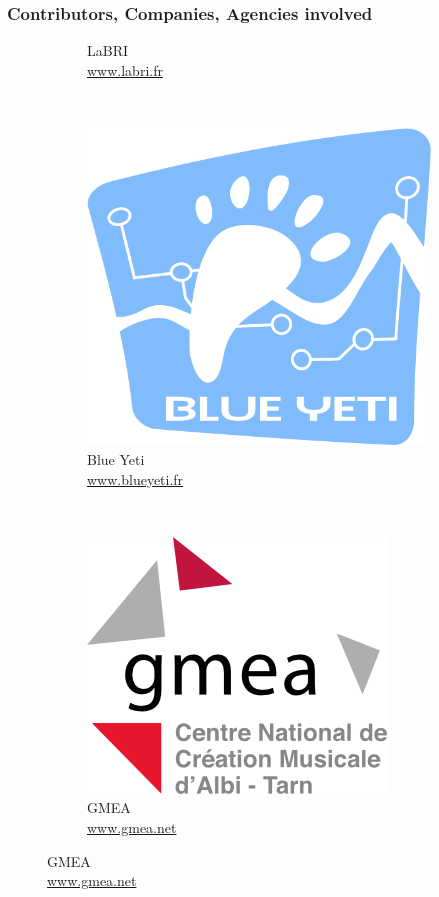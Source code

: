 \documentclass{beamer}
\begin{document}
\begin{frame}
    \frametitle{Contributors, Companies, Agencies involved}
    \begin{figure}[htbp]
    \begin{subfigure}[b]{0.30\textwidth} 
        \centering
        
        \caption{LaBRI \\ \url{www.labri.fr}}
    \end{subfigure}
    ~
    \begin{subfigure}[b]{0.30\textwidth} 
        \centering
        \includegraphics[scale=0.12]{images/by.png}
        \caption[]{Blue Yeti\\ \url{www.blueyeti.fr}}
    \end{subfigure}
    ~
    \begin{subfigure}[b]{0.30\textwidth} 
        \centering
        \includegraphics[scale=0.15]{images/gmea.png}
        \caption[]{GMEA\\\url{www.gmea.net}}
    \end{subfigure}
    

\end{figure}
\end{frame}
\end{document}
